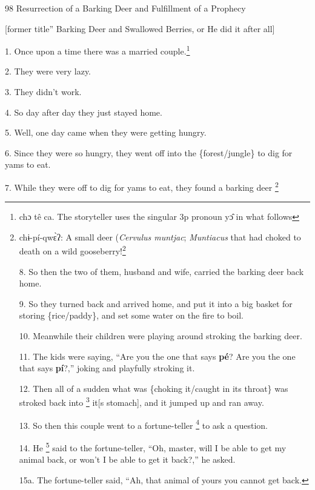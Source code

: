 
98 Resurrection of a Barking Deer and Fulfillment of a Prophecy

[former title'' Barking Deer and Swallowed Berries, or He did it after all]

1. Once upon a time there was a married couple.\footnote{chɔ  tê  ca. The storyteller uses the singular 3p pronoun yɔ̂ in what follows}

2. They were very lazy.

3. They didn't work.

4. So day after day they just stayed home.

5. Well, one day came when they were getting hungry.

6. Since they were so hungry, they went off into the \{forest/jungle\} to dig for
yams to eat.

7. While they were off to dig for yams to eat, they found a barking deer \footnote{chɨ-pí-qwɛ̀ʔ: A small deer (\textit{Cervulus muntjac}; \textit{Muntiacus} that
had choked to death on a wild gooseberry!\footnote{qhâʔ-cÁ-šī: \textit{Sesbanea sesbans }or \textit{Phyllanthus emblica}.}

8. So then the two of them, husband and wife, carried the barking deer back home.

9. So they turned back and arrived home, and put it into a big basket for storing
\{rice/paddy\}, and set some water on the fire to boil.

10. Meanwhile their children were playing around stroking the barking deer.

11. The kids were saying, ``Are you the one that says \textbf{pé}? Are you the
one that says \textbf{pí}?,'' joking and playfully stroking it.

12. Then all of a sudden what was \{choking it/caught in its throat\} was stroked
back into \footnote{This complex verbal idea (stroke back into) is conveyed by a three-verb concatenation:} it[s stomach], and it jumped up and ran away.

13. So then this couple went to a fortune-teller \footnote{mɔ́ `teacher; master; expert; possessor of occult knowledge' \texttt{<} Tai} to ask a question.

14. He \footnote{The pronoun is not expressed, but the context makes it clear that it is the} said to the fortune-teller, ``Oh, master, will I be able to get my animal
back, or won't I be able to get it back?,'' he asked.

15a. The fortune-teller said, ``Ah, that animal of yours you cannot get back.

}
